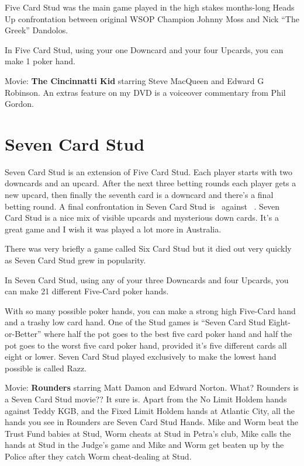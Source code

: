 Five Card Stud was the main game played in the high stakes months-long
Heads Up confrontation between original WSOP Champion Johnny Moss and
Nick ``The Greek'' Dandolos. 

In Five Card Stud, using your one Downcard and your four Upcards, you
can make 1 poker hand.

Movie: \textbf{The Cincinnatti Kid} starring Steve MacQueen and Edward G
Robinson. An extras feature on my DVD is a voiceover commentary from
Phil Gordon.

\section{Seven Card Stud}

Seven Card Stud is an extension of Five Card Stud. Each player starts
with two downcards and an upcard. After the next three betting rounds
each player gets a new upcard, then finally the seventh card is a
downcard and there's a final betting round. A final confrontation in
Seven Card Stud is \back\back\nines\Qd\Jd\tred\back\ against
\back\back\fourh\Jh\tend\trec\back\ . Seven Card Stud is a nice mix of
visible upcards and mysterious down cards. It's a great game and I
wish it was played a lot more in Australia.

There was very briefly a game called Six Card Stud but it died out
very quickly as Seven Card Stud grew in popularity.

In Seven Card Stud, using any of your three Downcards and four
Upcards, you can make 21 different Five-Card poker hands.

With so many possible poker hands, you can make a strong high
Five-Card hand and a trashy low card hand. One of the Stud games is
``Seven Card Stud Eight-or-Better'' where half the pot goes to the
best five card poker hand and half the pot goes to the worst five card
poker hand, provided it's five different cards all eight or lower.
Seven Card Stud played exclusively to make the lowest hand possible is
called Razz.

Movie: \textbf{Rounders} starring Matt Damon and Edward Norton.
What? Rounders is a Seven Card Stud movie?? It sure is. Apart from the
No Limit Holdem hands against Teddy KGB, and the Fixed Limit Holdem
hands at Atlantic City, all the hands you see in Rounders are Seven
Card Stud Hands. Mike and Worm beat the Trust Fund babies at Stud,
Worm cheats at Stud in Petra's club, Mike calls the hands at Stud in
the Judge's game and Mike and Worm get beaten up by the Police after
they catch Worm cheat-dealing at Stud.

